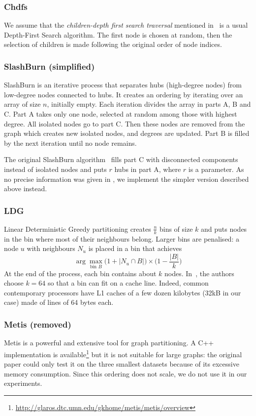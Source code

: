 \subsubsection{Chdfs}
We assume that the \textit{children-depth first search traversal} mentioned in~\cite{gorder} is a usual Depth-First Search algorithm. The first node is chosen at random, then the selection of children is made following the original order of node indices.

\subsubsection{SlashBurn (simplified)} 
%
SlashBurn is an iterative process that separates hubs (high-degree nodes) from low-degree nodes connected to hubs.
%
It creates an ordering by iterating over an array of size $n$, initially empty.
%
Each iteration divides the array in parts A, B and C. Part A takes only one node, selected at random among those with highest degree. All isolated nodes go to part C. Then these nodes are removed from the graph which creates new isolated nodes, and degrees are updated. Part B is filled by the next iteration until no node remains.

The original SlashBurn algorithm~\cite{slashburn} fills part C with disconnected components instead of isolated nodes and puts $r$ hubs in part A, where $r$ is a parameter. As no precise information was given in \cite{gorder}, we implement the simpler version described above instead.

\subsubsection{LDG}
Linear Deterministic Greedy partitioning \cite{ldg} creates $\frac{n}{k}$ bins of size $k$ and puts nodes in the bin where most of their neighbours belong. 
%
Larger bins are penalised: a node $u$ with neighbours $N_u$ is placed in a bin that achieves
$$\arg\max_{\text{bin }B}\Big(1+|N_u\cap B|\Big) \times \Big(1-\frac{|B|}{k}\Big)$$
%
At the end of the process, each bin contains about $k$ nodes.
%
In~\cite{gorder}, the authors choose $k=64$ so that a bin can fit on a cache line. Indeed, common contemporary processors have L1 caches of a few dozen kilobytes (32kB in our case) made of lines of 64 bytes each.

\subsubsection{Metis (removed)}
Metis is a powerful and extensive tool for graph partitioning. A C++ implementation is available\footnote{\url{http://glaros.dtc.umn.edu/gkhome/metis/metis/overview}} but it is not suitable for large graphs: the original paper could only test it on the three smallest datasets because of its excessive memory consumption. Since this ordering does not scale, we do not use it in our experiments.

